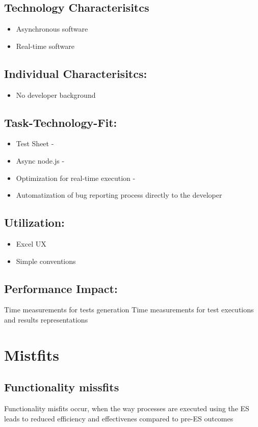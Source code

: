 \subsection{Technology Characterisitcs}
\begin{itemize}
	\item Asynchronous software
	\item	Real-time software
\end{itemize}

\subsection{Individual Characterisitcs:}
\begin{itemize}
	\item  No developer background
\end{itemize}

\subsection{Task-Technology-Fit:}
\begin{itemize}
	\item Test Sheet - 
	\item Async node.js -
	\item Optimization for real-time execution - 
	\item Automatization of bug reporting process directly to the developer
\end{itemize}

\subsection{Utilization:}
\begin{itemize}
	\item Excel UX
	\item Simple conventions
\end{itemize}

\subsection{Performance Impact:}
Time measurements for tests generation
Time measurements for test executions and results representations

\section{Mistfits}
\subsection{Functionality missfits}
Functionality misfits occur, when the way processes are executed using the ES leads to reduced efficiency and effectivenes compared to pre-ES outcomes 

